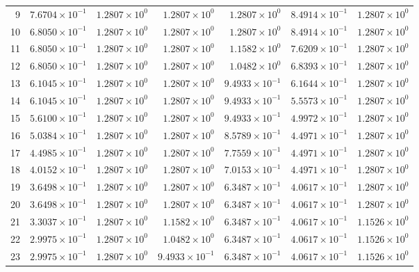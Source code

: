 \begin{table}[H]
\begin{tabular}{@{}rrrrrrr@{}}
9 & $7.6704\times10^{-1}$ & $1.2807\times10^{0}$ & $1.2807\times10^{0}$ & $1.2807\times10^{0}$ & $8.4914\times10^{-1}$ & $1.2807\times10^{0}$\\
10 & $6.8050\times10^{-1}$ & $1.2807\times10^{0}$ & $1.2807\times10^{0}$ & $1.2807\times10^{0}$ & $8.4914\times10^{-1}$ & $1.2807\times10^{0}$\\
11 & $6.8050\times10^{-1}$ & $1.2807\times10^{0}$ & $1.2807\times10^{0}$ & $1.1582\times10^{0}$ & $7.6209\times10^{-1}$ & $1.2807\times10^{0}$\\
12 & $6.8050\times10^{-1}$ & $1.2807\times10^{0}$ & $1.2807\times10^{0}$ & $1.0482\times10^{0}$ & $6.8393\times10^{-1}$ & $1.2807\times10^{0}$\\
13 & $6.1045\times10^{-1}$ & $1.2807\times10^{0}$ & $1.2807\times10^{0}$ & $9.4933\times10^{-1}$ & $6.1644\times10^{-1}$ & $1.2807\times10^{0}$\\
14 & $6.1045\times10^{-1}$ & $1.2807\times10^{0}$ & $1.2807\times10^{0}$ & $9.4933\times10^{-1}$ & $5.5573\times10^{-1}$ & $1.2807\times10^{0}$\\
15 & $5.6100\times10^{-1}$ & $1.2807\times10^{0}$ & $1.2807\times10^{0}$ & $9.4933\times10^{-1}$ & $4.9972\times10^{-1}$ & $1.2807\times10^{0}$\\
16 & $5.0384\times10^{-1}$ & $1.2807\times10^{0}$ & $1.2807\times10^{0}$ & $8.5789\times10^{-1}$ & $4.4971\times10^{-1}$ & $1.2807\times10^{0}$\\
17 & $4.4985\times10^{-1}$ & $1.2807\times10^{0}$ & $1.2807\times10^{0}$ & $7.7559\times10^{-1}$ & $4.4971\times10^{-1}$ & $1.2807\times10^{0}$\\
18 & $4.0152\times10^{-1}$ & $1.2807\times10^{0}$ & $1.2807\times10^{0}$ & $7.0153\times10^{-1}$ & $4.4971\times10^{-1}$ & $1.2807\times10^{0}$\\
19 & $3.6498\times10^{-1}$ & $1.2807\times10^{0}$ & $1.2807\times10^{0}$ & $6.3487\times10^{-1}$ & $4.0617\times10^{-1}$ & $1.2807\times10^{0}$\\
20 & $3.6498\times10^{-1}$ & $1.2807\times10^{0}$ & $1.2807\times10^{0}$ & $6.3487\times10^{-1}$ & $4.0617\times10^{-1}$ & $1.2807\times10^{0}$\\
21 & $3.3037\times10^{-1}$ & $1.2807\times10^{0}$ & $1.1582\times10^{0}$ & $6.3487\times10^{-1}$ & $4.0617\times10^{-1}$ & $1.1526\times10^{0}$\\
22 & $2.9975\times10^{-1}$ & $1.2807\times10^{0}$ & $1.0482\times10^{0}$ & $6.3487\times10^{-1}$ & $4.0617\times10^{-1}$ & $1.1526\times10^{0}$\\
23 & $2.9975\times10^{-1}$ & $1.2807\times10^{0}$ & $9.4933\times10^{-1}$ & $6.3487\times10^{-1}$ & $4.0617\times10^{-1}$ & $1.1526\times10^{0}$\\

\end{tabular}
\end{table}
